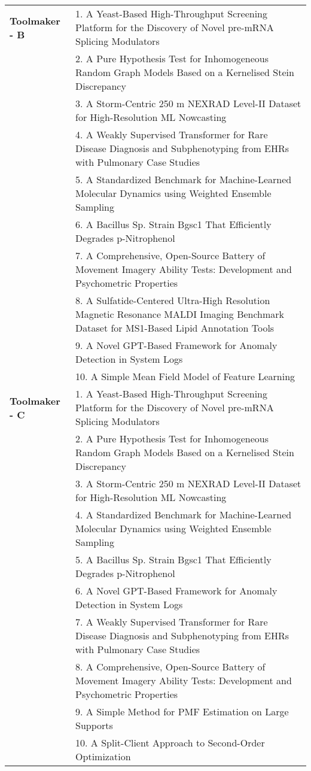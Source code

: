 \documentclass{article}
\begin{document}
\begin{longtable}{p{2.5cm}p{13cm}}
\textbf{Toolmaker - B} & 1. A Yeast-Based High-Throughput Screening Platform for the Discovery of Novel pre-mRNA Splicing Modulators \\
& 2. A Pure Hypothesis Test for Inhomogeneous Random Graph Models Based on a Kernelised Stein Discrepancy \\
& 3. A Storm-Centric 250 m NEXRAD Level-II Dataset for High-Resolution ML Nowcasting \\
& 4. A Weakly Supervised Transformer for Rare Disease Diagnosis and Subphenotyping from EHRs with Pulmonary Case Studies \\
& 5. A Standardized Benchmark for Machine-Learned Molecular Dynamics using Weighted Ensemble Sampling \\
& 6. A Bacillus Sp. Strain Bgsc1 That Efficiently Degrades p-Nitrophenol \\
& 7. A Comprehensive, Open-Source Battery of Movement Imagery Ability Tests: Development and Psychometric Properties \\
& 8. A Sulfatide-Centered Ultra-High Resolution Magnetic Resonance MALDI Imaging Benchmark Dataset for MS1-Based Lipid Annotation Tools \\
& 9. A Novel GPT-Based Framework for Anomaly Detection in System Logs \\
& 10. A Simple Mean Field Model of Feature Learning \\
\midrule

\textbf{Toolmaker - C} & 1. A Yeast-Based High-Throughput Screening Platform for the Discovery of Novel pre-mRNA Splicing Modulators \\
& 2. A Pure Hypothesis Test for Inhomogeneous Random Graph Models Based on a Kernelised Stein Discrepancy \\
& 3. A Storm-Centric 250 m NEXRAD Level-II Dataset for High-Resolution ML Nowcasting \\
& 4. A Standardized Benchmark for Machine-Learned Molecular Dynamics using Weighted Ensemble Sampling \\
& 5. A Bacillus Sp. Strain Bgsc1 That Efficiently Degrades p-Nitrophenol \\
& 6. A Novel GPT-Based Framework for Anomaly Detection in System Logs \\
& 7. A Weakly Supervised Transformer for Rare Disease Diagnosis and Subphenotyping from EHRs with Pulmonary Case Studies \\
& 8. A Comprehensive, Open-Source Battery of Movement Imagery Ability Tests: Development and Psychometric Properties \\
& 9. A Simple Method for PMF Estimation on Large Supports \\
& 10. A Split-Client Approach to Second-Order Optimization \\
\bottomrule
\end{longtable}
\end{document}
